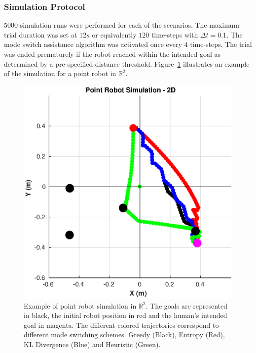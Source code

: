 \documentclass[conference]{IEEEtran}
\begin{document}
\subsubsection{Simulation Protocol}
5000 simulation runs were performed for each of the scenarios. 
The maximum trial duration was set at $12s$ or equivalently $120$ time-steps with $\Delta t = 0.1$. The mode switch assistance algorithm was activated once every $4$ time-steps. The trial was ended prematurely if the robot reached within the intended goal as determined by a pre-specified distance threshold. Figure~\ref{fig:ws_sim} illustrates an example of the simulation for a point robot in $\mathbb{R}^2$. 
 \begin{figure}[h!]
	\centering
	\includegraphics[width= 0.8\hsize, height=0.28\vsize]{./figures/WS_SIM.eps}
	\vspace{-0.35cm}
	\caption{Example of point robot simulation in $\mathbb{R}^2$. The goals are represented in black, the initial robot position in red and the human's intended goal in magenta. The different colored trajectories correspond to different mode switching schemes. Greedy (Black), Entropy (Red), KL Divergence (Blue) and Heuristic (Green).} 
	\label{fig:ws_sim}
\end{figure}
\end{document}
